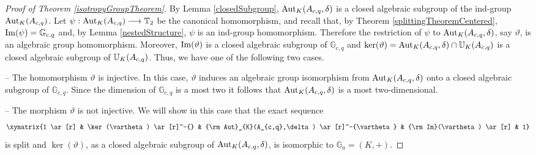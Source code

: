 \documentclass{article}
\newcommand \G {\mathbb{G}}
\newcommand \T {\mathbb{T}}
\renewcommand \a {A}
\renewcommand \k {K}
\newcommand \saut {{\rm \mathbb{U}}}
\newcommand \auto {{\rm Aut}}
\newcommand \image {{\rm Im}}
\begin{document}
{\begin{proof}[Proof of Theorem \ref{isotropyGroupTheorem}] By Lemma \ref{closedSubgroup}, $\auto_{\k}(\a_{c,q},\delta)$ is a closed algebraic subgroup of the ind-group $\auto_{\k}(\a_{c,q})$. Let $\psi: \auto_{\k}(\a_{c,q})\longrightarrow\T_2$ be the canonical homomorphism, and recall that, by Theorem \ref{splittingTheoremCentered}, $\image(\psi)=\G_{c,q}$ and, by Lemma \ref{nestedStructure}, $\psi$ is an ind-group homomorphism. Therefore the restriction of $\psi$ to $\auto_{\k}(\a_{c,q},\delta)$, say $\vartheta$, is an algebraic group homomorphism. Moreover, $\image(\vartheta)$ is a closed algebraic subgroup of $\G_{c,q}$ and $\ker(\vartheta)=\auto_{\k}(\a_{c,q},\delta)\cap \saut_{\k}(\a_{c,q})$ is a closed algebraic subgroup of $\saut_{\k}(\a_{c,q})$. Thus, we have one of the following two cases.
	
	\medskip -- The homomorphism $\vartheta$ is injective. In this case, $\vartheta$ induces an algebraic group isomorphism from $\auto_{\k}(\a_{c,q},\delta)$ onto a closed algebraic subgroup of $\G_{c,q}$. Since the dimension of $\G_{c,q}$ is a most two it follows that $\auto_{\k}(\a_{c,q},\delta)$ is a most two-dimensional. 
	
	\medskip -- The morphism $\vartheta$ is not injective. We will show in this case that the exact sequence
	$$\xymatrix{1 \ar[r] & \ker(\vartheta) \ar[r]^-{} & \auto_{\k}(\a_{c,q},\delta) \ar[r]^-{\vartheta} & \image(\vartheta) \ar[r] & 1}$$ is split and $\ker(\vartheta)$, as a closed algebraic subgroup of $\auto_{\k}(\a_{c,q},\delta)$, is isomorphic to $\G_a=(\k,+)$.
	

\end{proof}}
\end{document}
